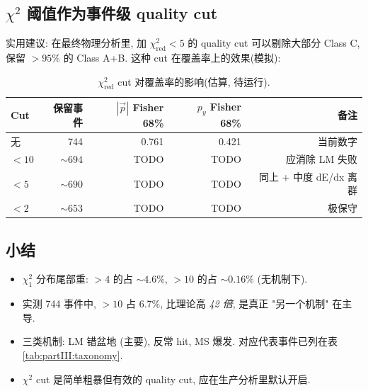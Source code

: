 \subsection{$\chi^2$ 阈值作为事件级 quality cut}
\label{sec:partIII:chi2:cut}

实用建议: 在最终物理分析里, 加 $\chi^2_{\mathrm{red}} < 5$ 的 quality cut 可以剔除大部分 Class C, 保留 $> 95\%$ 的 Class A+B. 这种 cut 在覆盖率上的效果(模拟):

\begin{table}[H]
\centering\small
\caption{$\chi^2_{\mathrm{red}}$ cut 对覆盖率的影响(估算, 待运行).}
\label{tab:partIII:chi2_cut_estimate}
\begin{tabular}{lrrrr}
\toprule
Cut & 保留事件 & $|\vec p|$ Fisher 68\% & $p_y$ Fisher 68\% & 备注 \\
\midrule
无         & 744 & 0.761 & 0.421 & 当前数字 \\
$< 10$    & $\sim 694$ & TODO & TODO & 应消除 LM 失败 \\
$< 5$     & $\sim 690$ & TODO & TODO & 同上 + 中度 dE/dx 离群 \\
$< 2$     & $\sim 653$ & TODO & TODO & 极保守 \\
\bottomrule
\end{tabular}
\end{table}


\subsection{小结}
\label{sec:partIII:chi2:summary}

\begin{itemize}[nosep]
  \item $\chi^2_1$ 分布尾部重: $> 4$ 的占 $\sim 4.6\%$, $> 10$ 的占 $\sim 0.16\%$ (无机制下).
  \item 实测 744 事件中, $> 10$ 占 $6.7\%$, 比理论高 \emph{42 倍}, 是真正 "另一个机制" 在主导.
  \item 三类机制: LM 错盆地 (主要), 反常 hit, MS 爆发. 对应代表事件已列在表 \ref{tab:partIII:taxonomy}.
  \item $\chi^2$ cut 是简单粗暴但有效的 quality cut, 应在生产分析里默认开启.
\end{itemize}

